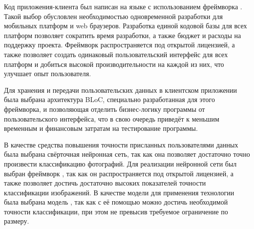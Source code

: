 \nwln
Код приложения-клиента был написан на языке  с использованием фреймворка \cite{flutter-vs-react}.
Такой выбор обусловлен необходимостью одновременной разработки для мобильных платформ и web браузеров.
Разработка единой кодовой базы для всех платформ позволяет сократить время разработки, а также бюджет и расходы на поддержку проекта.
Фреймворк  распространяется под открытой лицензией, а также позволяет создать одинаковый пользовательский интерфейс для всех платформ и добиться высокой производительности на каждой из них, что улучшает опыт пользователя\cite{flutter-better}.

\nwln
Для хранения и передачи пользовательских данных в клиентском приложении была выбрана архитектура BLoC\cite{bloc-better}, специально разработанная для этого фреймворка, и позволяющая отделить бизнес-логику программы от пользовательского интерфейса, что в свою очередь приведёт к меньшим временным и финансовым затратам на тестирование программы.

\nwln
В качестве средства повышения точности присланных пользователями данных была выбрана свёрточная нейронная сеть\cite{convolutional-better}, так как она позволяет достаточно точно произвести классификацию фотографий.
Для реализации нейронной сети был выбран фреймворк \cite{tensorflow-better}, так как он распространяется под открытой лицензией, а также позволяет достичь достаточно высоких показателей точности классификации изображений.
В качестве модели для применения технологии  была выбрана модель \cite{xception-better}, так как с её помощью можно достичь необходимой точности классификации, при этом не превысив требуемое ограничение по размеру.
